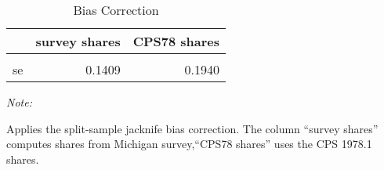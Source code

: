 \begin{table}

\caption{\label{tab:bias:out:2sls:stage2}Bias Correction}
\centering
\begin{threeparttable}
\begin{tabular}[t]{lrr}
\toprule
  & survey shares & CPS78 shares\\
\midrule
\cellcolor{gray!6}{coeff.} & \cellcolor{gray!6}{0.3636} & \cellcolor{gray!6}{0.6007}\\
se & 0.1409 & 0.1940\\
\bottomrule
\end{tabular}
\begin{tablenotes}
\item \textit{Note: } 
\item Applies the split-sample jacknife bias correction. The column ``survey shares'' computes shares from Michigan survey,``CPS78 shares'' uses the CPS 1978.1 shares.
\end{tablenotes}
\end{threeparttable}
\end{table}
